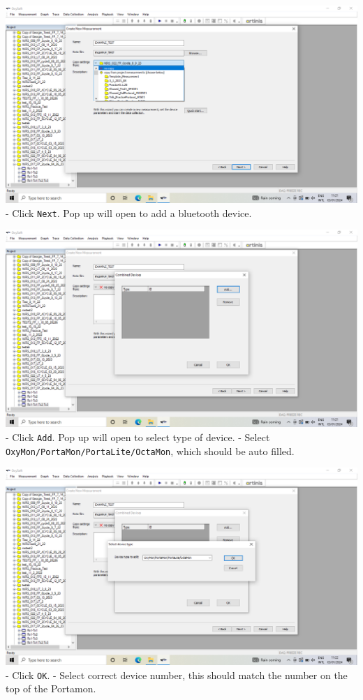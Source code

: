 \documentclass[
]{book}
\begin{document}
\includegraphics[width=1\linewidth]{images/startnewmeasurement/05_copy_no_settings}
- Click \texttt{Next}. Pop up will open to add a bluetooth device.

\includegraphics[width=1\linewidth]{images/startnewmeasurement/06_add_device}
- Click \texttt{Add}. Pop up will open to select type of device.
- Select \texttt{OxyMon/PortaMon/PortaLite/OctaMon}, which should be auto filled.

\includegraphics[width=1\linewidth]{images/startnewmeasurement/07_type_of_device_to_add}
- Click \texttt{OK}.
- Select correct device number, this should match the number on the top of the Portamon.
\end{document}
